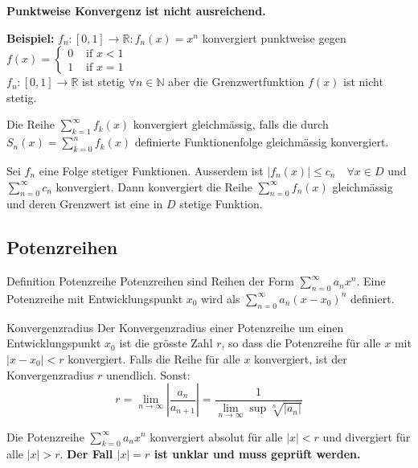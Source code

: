 \documentclass[a4paper,fontsize = 7pt]{scrartcl}
\def\limn{\lim_{n\to \infty}}
\def\sumk{\sum_{k=1}^\infty}
\def\R{\mathbb{R}}
\def\N{\mathbb{N}}
\begin{document}
\textbf{Punktweise Konvergenz ist nicht ausreichend.}

\vspace{0.5mm}
  \textbf{Beispiel: }$f_n: [0, 1] \to \R: f_n(x) = x^n$ konvergiert punktweise gegen $f(x) = \left\{
    \begin{array}{ll}
      0  & \mbox{ if } x < 1 \\
      1 & \mbox{ if } x = 1
    \end{array}
  \right.$
  \\$f_n: [0, 1] \to \R$ ist stetig $\forall n \in \N$
  aber die Grenzwertfunktion $f(x)$ ist nicht stetig.


Die Reihe $\sumk f_k(x)$ konvergiert gleichmässig, falls die durch $S_n(x) = \sum_{k=0}^n f_k(x)$ definierte Funktionenfolge gleichmässig konvergiert.

\begin{subbox}{}
  \vspace{-4pt}
 Sei $f_n$ eine Folge stetiger Funktionen. Ausserdem ist $|f_n(x)| \le c_n \quad \forall x \in D$ und $\sum_{n=0}^\infty c_n$ konvergiert. Dann konvergiert die Reihe $\sum_{n=0}^\infty f_n(x)$ gleichmässig und deren Grenzwert ist eine in $D$ stetige Funktion.
 \vspace{-4pt}
\end{subbox}

\subsection{Potenzreihen}
\begin{subbox}{Definition Potenzreihe}
\vspace{-4pt}
 Potenzreihen sind Reihen der Form $\sum_{n=0}^\infty a_n x^n$. Eine Potenzreihe mit Entwicklungspunkt $x_0$ wird als $\sum_{n=0}^\infty a_n(x-x_0)^n$ definiert.
 \vspace{-4pt}
\end{subbox}

\begin{mainbox}{Konvergenzradius}
  \vspace{-4pt}
 Der Konvergenzradius einer Potenzreihe um einen Entwicklungspunkt $x_0$ ist die grösste Zahl $r$, so dass die Potenzreihe für alle $x$ mit $|x - x_0| < r$ konvergiert. Falls die Reihe für alle $x$ konvergiert, ist der Konvergenzradius $r$ unendlich. Sonst:
 $$r = \limn \left| \frac{a_n}{a_{n+1}} \right| = \frac{1}{\limn\sup \sqrt[n]{|a_n|}} $$
 \vspace{-12pt}
\end{mainbox}
Die Potenzreihe $\sum_{k=0}^\infty a_n x^n$ konvergiert absolut für alle $|x| < r$ und divergiert für alle $|x| > r$. \textbf{Der Fall $|x| = r$ ist unklar und muss geprüft werden.}
\end{document}
